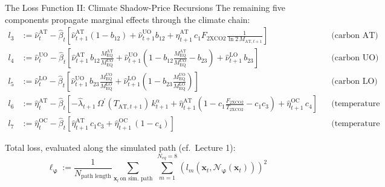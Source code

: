 \documentclass[aspectratio=169,11pt]{beamer}
\newcommand{\x}{\bm{x}}
\newcommand{\nn}{\mathcal{N}_{\bm{\varphi}}}
\begin{document}
\begin{frame}{The Loss Function II: Climate Shadow-Price Recursions}
\footnotesize
The remaining five components propagate marginal effects through the climate chain:
\vspace{-0.1cm}
{\scriptsize
\begin{align*}
l_3 &:= \hat{\nu}_t^{\text{AT}} - \hat{\beta}_t \left[\hat{\nu}_{t+1}^{\text{AT}} \left(1 - b_{12} \right) + \hat{\nu}_{t+1}^{\text{UO}} b_{12} + \hat{\eta}_{t+1}^{\text{AT}}\, c_1 F_{\text{2XCO2}} \tfrac{1}{\ln 2\, M_{\text{AT},t+1}} \right]
&& \text{(carbon AT)} \\[1pt]
l_4 &:= \hat{\nu}_t^{\text{UO}} - \hat{\beta}_t \left[\hat{\nu}_{t+1}^{\text{AT}}\, b_{12} \tfrac{M^{\text{AT}}_{\text{EQ}}}{M^{\text{UO}}_{\text{EQ}}} + \hat{\nu}_{t+1}^{\text{UO}} \left(1 - b_{12} \tfrac{M^{\text{AT}}_{\text{EQ}}}{M^{\text{UO}}_{\text{EQ}}} - b_{23}\right) + \hat{\nu}_{t+1}^{\text{LO}}\, b_{23} \right]
&& \text{(carbon UO)} \\[1pt]
l_5 &:= \hat{\nu}_t^{\text{LO}} - \hat{\beta}_t \left[\hat{\nu}_{t+1}^{\text{UO}}\, b_{23} \tfrac{M^{\text{UO}}_{\text{EQ}}}{M^{\text{LO}}_{\text{EQ}}} + \hat{\nu}_{t+1}^{\text{LO}} \left(1 - b_{23} \tfrac{M^{\text{UO}}_{\text{EQ}}}{M^{\text{LO}}_{\text{EQ}}} \right) \right]
&& \text{(carbon LO)} \\[1pt]
l_6 &:= \hat{\eta}_t^{\text{AT}} - \hat{\beta}_t \left[-\hat{\lambda}_{t+1}\, \Omega^{\prime}(T_{\text{AT},t+1})\, k^{\alpha}_{t+1} + \hat{\eta}_{t+1}^{\text{AT}} \left(1-c_1\tfrac{F_{\text{2XCO2}}}{T_{\text{2XCO2}}} - c_1 c_3\right) + \hat{\eta}_{t+1}^{\text{OC}}\, c_{4}  \right]
&& \text{(temperature AT)} \\[1pt]
l_7 &:= \hat{\eta}_t^{\text{OC}} - \hat{\beta}_t \left[\hat{\eta}_{t+1}^{\text{AT}}\,  c_1 c_{3}  +  \hat{\eta}_{t+1}^{\text{OC}}\,  (1 - c_{4})\right]
&& \text{(temperature OC)}
\end{align*}}

\vspace{-0.05cm}
\small
Total loss, evaluated along the simulated path (cf.\ Lecture 1):
\vspace{-0.1cm}
\[
\boxed{\;\ell_{\bm{\varphi}} := \frac{1}{N_{\text{path length}}}\sum_{\x_t \,\text{on sim.\ path}}\ \sum_{m=1}^{N_{eq}=8}\left(l_{m}(\x_t, \nn(\x_t))\right)^2\;}
\]
\end{frame}
\end{document}
